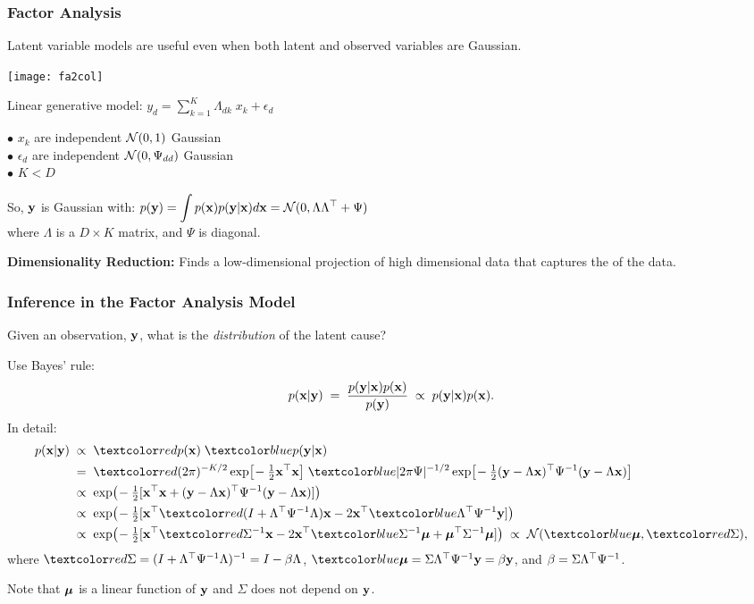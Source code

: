 \begin{frame}
\frametitle{Factor Analysis}

Latent variable models are useful even when both latent and observed
variables are Gaussian.

\vfill

\begin{minipage}{43mm}
\centerline{\texttt{[image: fa2col]}}
\end{minipage} \hspace{5mm}
\begin{minipage}{70mm}
Linear generative model: $\displaystyle
y_d = \sum_{k=1}^K \Lambda_{dk} \; x_k + \epsilon_d$

$\bullet$ $x_k$ are independent ${\cal N}(0,1)$ Gaussian  \\
$\bullet$ $\epsilon_d$ are
independent ${\cal N}(0,\Psi_{dd})$ Gaussian  \\
$\bullet$ $K\!<\!D$
\end{minipage}

So, $\mathbf y$ is Gaussian with: $\displaystyle
p(\mathbf y) = \int p(\mathbf x) p(\mathbf y|\mathbf x) d\mathbf x = {\cal N}(0,\Lambda \Lambda{\scriptsize^{\top}} +
\Psi) $ \\
where $\Lambda$ is a $D\times K$ matrix, and $\Psi$ is diagonal.

{\bf Dimensionality Reduction:} Finds a low-dimensional projection of
high dimensional data that captures the 
of the data.
\end{frame}

\begin{frame}
\frametitle{Inference in the Factor Analysis Model}

Given an observation, $\mathbf y$, what is the \emph{distribution} of the
latent cause?

Use Bayes' rule:
\[
p(\mathbf x|\mathbf y)\;=\;\frac{p(\mathbf y|\mathbf x)p(\mathbf x)}{p(\mathbf y)}
\;\propto\;p(\mathbf y|\mathbf x)p(\mathbf x).
\]
In detail:
\[
\begin{split}
p(\bfx|\bfy)\;&\propto\;\Red{p(\bfx)}\;\Blue{p(\bfy|\bfx)}\\
&=\;\Red{(2\pi)^{-K/2}\exp\!\big[\!-\tfrac{1}{2}\bfx\T\bfx\big]}\;
\Blue{|2\pi\Psi|^{-1/2}\exp\!\big[\!-\tfrac{1}{2}(\bfy-\Lambda\bfx)\T
\Psi^{-1}(\bfy-\Lambda\bfx)\big]}\\
&\propto\;\exp\!\big(\!-\tfrac{1}{2}[\bfx\T\bfx+
(\bfy-\Lambda\bfx)\T\Psi^{-1}(\bfy-\Lambda \bfx)]\big)\\
&\propto\;\exp\!\big(\!-\tfrac{1}{2}[\bfx\T
\Red{(I+\Lambda\T\Psi^{-1}\Lambda)}\bfx-2\bfx\T
\Blue{\Lambda\T\Psi^{-1}\bfy}]\big)\\
&\propto\;\exp\!\big(\!-\tfrac{1}{2}[\bfx\T
\Red{\Sigma^{-1}}\bfx-2\bfx\T\Blue{\Sigma^{-1}\bmu}
+\bmu\T\Sigma^{-1}\bmu]\big)\;\propto\;{\cal N}(\Blue{\bmu},\Red{\Sigma}),
\end{split}
\]
where $\Red{\Sigma=(I+\Lambda\T\Psi^{-1}\Lambda)^{-1}=I-\beta\Lambda}$, $\Blue{\bmu=\Sigma\Lambda\T\Psi^{-1}\bfy=\beta\bfy}$, and $\beta=\Sigma\Lambda{\scriptsize^{\top}}\Psi^{-1}$.

Note that ${\boldsymbol{\mu}}$ is a linear function of $\mathbf y$ and $\Sigma$ does not
depend on $\mathbf y$.


\end{frame}


